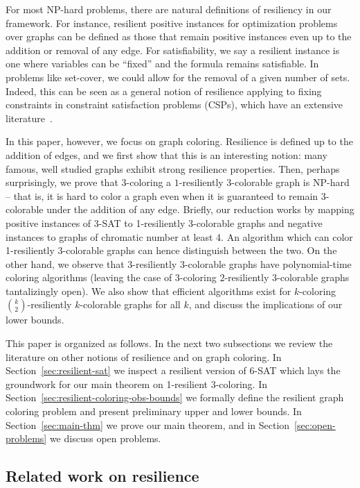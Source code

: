 \documentclass[10pt]{article}
\begin{document}
For most NP-hard problems, there are natural definitions of resiliency in our
framework.  For instance, resilient positive instances for optimization
problems over graphs can be defined as those that remain positive instances
even up to the addition or removal of any edge.  For satisfiability, we say a
resilient instance is one where variables can be ``fixed'' and the formula
remains satisfiable. In problems like set-cover, we could allow for the removal
of a given number of sets. Indeed, this can be seen as a general notion of
resilience applying to fixing constraints in 
constraint satisfaction problems (CSPs), which have an extensive
literature~\cite{Kumar92}.

In this
paper, however, we focus on graph coloring. Resilience is defined up to the addition of
edges, and we first show that this is an interesting notion: many famous, well
studied graphs exhibit strong resilience properties. Then, perhaps
surprisingly, we prove that $3$-coloring a $1$-resiliently 3-colorable graph is
NP-hard -- that is, it is hard to color a graph even when it is guaranteed to
remain $3$-colorable under the addition of any edge.  Briefly, our reduction
works by mapping positive instances of 3-SAT to 1-resiliently 3-colorable
graphs and negative instances to graphs of chromatic number at least 4. An
algorithm which can color 1-resiliently 3-colorable graphs can hence
distinguish between the two. On the other hand, we observe that $3$-resiliently
$3$-colorable graphs have polynomial-time coloring algorithms (leaving the case
of 3-coloring $2$-resiliently $3$-colorable graphs tantalizingly open). We also
show that efficient algorithms exist for $k$-coloring
$\binom{k}{2}$-resiliently $k$-colorable graphs for all $k$, and discuss the
implications of our lower bounds. 

This paper is organized as follows. In the next two subsections we review the
literature on other notions of resilience and on graph coloring. In
Section~\ref{sec:resilient-sat} we inspect a resilient version of 6-SAT which
lays the groundwork for our main theorem on 1-resilient 3-coloring. In
Section~\ref{sec:resilient-coloring-obs-bounds} we formally define the resilient
graph coloring problem and present preliminary upper and lower bounds. In
Section~\ref{sec:main-thm} we prove our main theorem, and in
Section~\ref{sec:open-problems} we discuss open problems.



\subsection{Related work on resilience}
\end{document}
